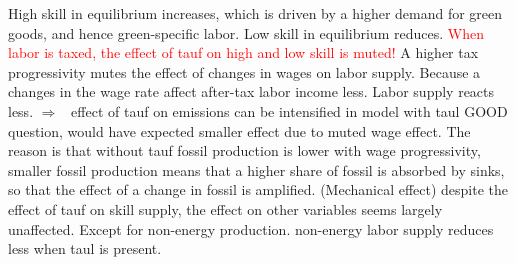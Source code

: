\documentclass[12pt]{article}
\newcommand{\ar}{$\Rightarrow$ \ }
\newcommand{\tr}[1]{\textcolor{red}{#1}}
\begin{document}
High skill in equilibrium increases, which is driven by a higher demand for green goods, and hence green-specific labor. Low skill in equilibrium reduces. \tr{When labor is taxed, the effect of tauf on high and low skill is muted!} A higher tax progressivity mutes the effect of changes in wages on labor supply. Because a changes in the wage rate affect after-tax labor income less. Labor supply reacts less. \ar effect of tauf on emissions can be intensified in model with taul GOOD question, would have expected smaller effect due to muted wage effect.   The reason is that without tauf fossil production is lower with wage progressivity, smaller fossil production means that a higher share of fossil is absorbed by sinks, so that the effect of a change in fossil is amplified. (Mechanical effect)
despite the effect of tauf on skill supply, the effect on other variables seems largely unaffected. Except for non-energy production. non-energy labor supply reduces less when taul is present. 
\end{document}

